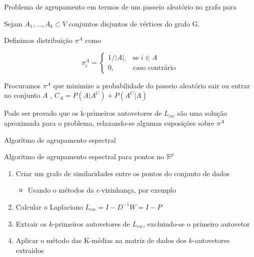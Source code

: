 \documentclass[11pt]{beamer}
\newcommand{\R}{\mathbb{R}}
\begin{document}
\begin{frame}{Problema de agrupamento em termos de um passeio aleatório no grafo para}

Sejam $A_1, ..., A_k \subset V$ conjuntos disjuntos de vértices do grafo G. 

\vspace{0.3cm}

Definimos distribuição $\pi^{A}$ como 

$$\pi^{A}_i = \begin{cases} 1/|A|, & \text{se } i \in A \\ 0, & \text{caso contrário}\end{cases}$$

\vspace{0.5cm}

Procuramos $\pi^A$ que minimize a probabilidade do passeio aleatório sair ou entrar no conjunto $A$ , $C_A = P(A|A^C) + P(A^C|A)$

\vspace{0.5cm}

Pode ser provado que os k-primeiros autovetores de $L_{rw}$ são uma solução aproximada para o problema, relaxando-se algumas suposições sobre $\pi^A$

\end{frame}

\begin{frame}{Algoritmo de agrupamento espectral}

\begin{block}{Algoritmo de agrupamento espectral para pontos no $\R^p$}
\begin{enumerate}
\item Criar um grafo de similaridades entre os pontos do conjunto de dados 

\begin{itemize}
\item Usando o métodos da $\epsilon$-vizinhança, por exemplo
\end{itemize}

\vspace{0.5cm}
\item Calcular o Laplaciano $L_{rw} = I - D^{-1}W = I - P$

\vspace{0.5cm}

\item Extrair os $k$-primeiros autovetores de $L_{rw}$, excluindo-se o primeiro autovetor

\vspace{0.5cm}

\item Aplicar o método das K-médias na matriz de dados dos $k$-autovetores extraidos

\end{enumerate}
\end{block}

\end{frame}
\end{document}
